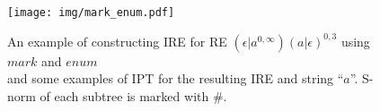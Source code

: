 \documentclass[AMA,STIX1COL]{WileyNJD-v2}
\begin{document}

\begin{figure}\label{fig_mark_enum}
\texttt{[image: img/mark\_enum.pdf]}
\caption{
An example of constructing IRE for RE $(\epsilon|a^{0,\infty})(a|\epsilon)^{0,3}$ using $mark$ and $enum$\\
and some examples of IPT for the resulting IRE and string ``$a$''.
S-norm of each subtree is marked with $\#$.
}
\end{figure}
\end{document}

